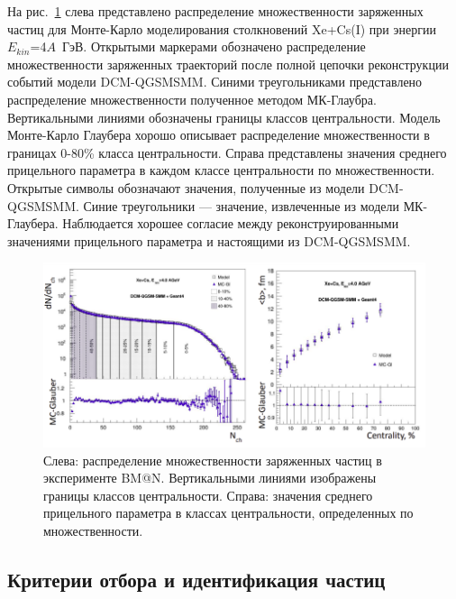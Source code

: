 На рис.~\ref{fig:bmn_multiplicity} слева представлено распределение множественности заряженных частиц для Монте-Карло моделирования столкновений Xe+Cs(I) при энергии $E_{kin}$=4$A$~ГэВ.
Открытыми маркерами обозначено распределение множественности заряженных траекторий после полной цепочки реконструкции событий модели DCM-QGSMSMM.
Синими треугольниками представлено распределение множественности полученное методом МК-Глаубра.
Вертикальными линиями обозначены границы классов центральности.
Модель Монте-Карло Глаубера хорошо описывает распределение множественности в границах 0-80\% класса центральности.
Справа представлены значения среднего прицельного параметра в каждом классе центральности по множественности.
Открытые символы обозначают значения, полученные из модели DCM-QGSMSMM.
Синие треугольники --- значение, извлеченные из модели МК-Глаубера.
Наблюдается хорошее согласие между реконструированными значениями прицельного параметра и настоящими из DCM-QGSMSMM.
%
\begin{figure}[ht]
\begin{center}
\includegraphics[width=0.95\linewidth]{images/mc_glauber_xecs_mult.png}
\caption{Слева: распределение множественности заряженных частиц в эксперименте BM@N. Вертикальными линиями изображены границы классов центральности. Справа: значения среднего прицельного параметра в классах центральности, определенных по множественности.}
\label{fig:bmn_multiplicity}
\end{center}
\end{figure}

\subsection{Критерии отбора и идентификация частиц}

